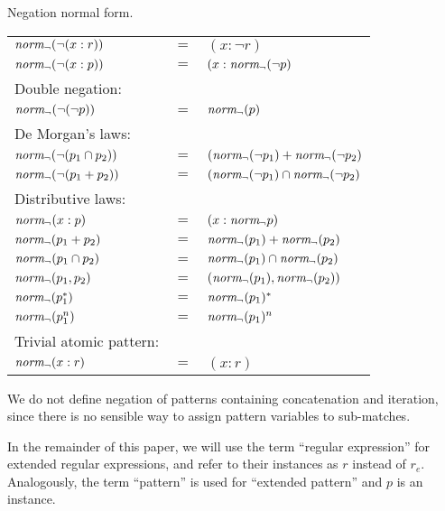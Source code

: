 \begin{defn}
   \label{defn-negnorm}
   Negation normal form.

   \begin{tabular}{lll}
      $\mathit{norm_\neg}(\neg(x : r))$		& $=$	& $(x : \neg r)$					\\
      $\mathit{norm_\neg}(\neg(x : p))$		& $=$	& $(x : \mathit{norm_\neg}(\neg p)$				\\
      Double negation:			&	&							\\
      $\mathit{norm_\neg}(\neg(\neg p))$		& $=$	& $\mathit{norm_\neg}(p)$						\\
      De Morgan's laws:			&	&							\\
      $\mathit{norm_\neg}(\neg(p_1 \cap p_2))$	& $=$	& $(\mathit{norm_\neg}(\neg p_1) + \mathit{norm_\neg}(\neg p_2)$		\\
      $\mathit{norm_\neg}(\neg(p_1 + p_2))$	& $=$	& $(\mathit{norm_\neg}(\neg p_1) \cap \mathit{norm_\neg}(\neg p_2)$		\\
      Distributive laws:		&	&							\\
      $\mathit{norm_\neg}(x : p)$			& $=$	& $(x : \mathit{norm_\neg} p)$					\\
      $\mathit{norm_\neg}(p_1 + p_2)$		& $=$	& $\mathit{norm_\neg}(p_1) + \mathit{norm_\neg}(p_2)$			\\
      $\mathit{norm_\neg}(p_1 \cap p_2)$		& $=$	& $\mathit{norm_\neg}(p_1) \cap \mathit{norm_\neg}(p_2)$			\\
      $\mathit{norm_\neg}(p_1, p_2)$		& $=$	& $(\mathit{norm_\neg}(p_1), \mathit{norm_\neg}(p_2))$			\\
      $\mathit{norm_\neg}(p_1^*)$			& $=$	& $\mathit{norm_\neg}(p_1)^*$					\\
      $\mathit{norm_\neg}(p_1^n)$			& $=$	& $\mathit{norm_\neg}(p_1)^n$					\\
      Trivial atomic pattern:		&	&							\\
      $\mathit{norm_\neg}(x : r)$			& $=$	& $(x : r)$						\\
   \end{tabular}
\end{defn}

We do not define negation of patterns containing concatenation and iteration,
since there is no sensible way to assign pattern variables to sub-matches.

In the remainder of this paper, we will use the term ``regular expression''
for extended regular expressions, and refer to their instances as $r$ instead
of $r_e$.  Analogously, the term ``pattern'' is used for ``extended pattern''
and $p$ is an instance.

